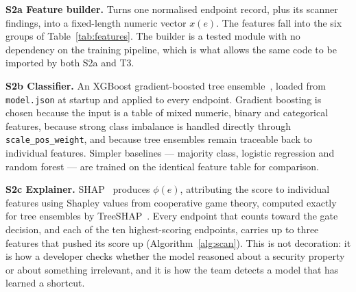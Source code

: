 \documentclass[conference]{IEEEtran}
\begin{document}
\textbf{S2a Feature builder.} Turns one normalised endpoint record, plus its scanner
findings, into a fixed-length numeric vector $x(e)$. The features fall into the six groups of
Table~\ref{tab:features}. The builder is a tested module with no dependency on the training
pipeline, which is what allows the same code to be imported by both S2a and T3.

\textbf{S2b Classifier.} An XGBoost gradient-boosted tree ensemble~\cite{xgboost}, loaded
from \texttt{model.json} at startup and applied to every endpoint. Gradient boosting is
chosen because the input is a table of mixed numeric, binary and categorical features,
because strong class imbalance is handled directly through \texttt{scale\_pos\_weight}, and
because tree ensembles remain traceable back to individual features. Simpler baselines ---
majority class, logistic regression and random forest --- are trained on the identical
feature table for comparison.

\textbf{S2c Explainer.} SHAP~\cite{shap} produces $\phi(e)$, attributing the score to
individual features using Shapley values from cooperative game theory, computed exactly for
tree ensembles by TreeSHAP~\cite{treeshap}. Every endpoint that counts toward the gate
decision, and each of the ten highest-scoring endpoints, carries up to three features
that pushed its score up (Algorithm~\ref{alg:scan}). This is not decoration: it is how a
developer checks whether the model reasoned about a security property or about something
irrelevant, and it is how the team detects a model that has learned a shortcut.
\end{document}
